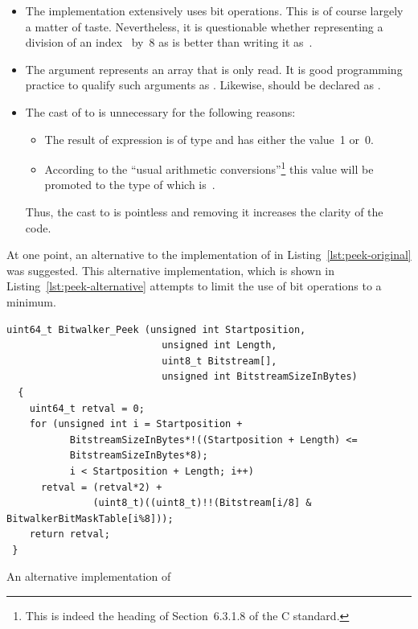 \begin{itemize}
\item The implementation extensively uses bit operations.
      This is of course largely a matter of taste.
      Nevertheless, it is questionable whether representing a division 
      of an index~ by~8 as  is better than writing it as~.
\item The argument  represents an array that is only read.
      It is good programming practice to qualify such arguments as .
	Likewise,  should be declared as .

\item The cast of  to  is unnecessary for the following reasons:
\begin{itemize}
\item The result of expression  is of type  and has either the value~1 or~0.
\item According to the ``usual arithmetic conversions''\footnote{%
     This is indeed the heading of Section~6.3.1.8 of the C standard.
}
this value will be promoted to the type of  which is~.
\end{itemize}

    Thus, the cast to  is pointless and removing it increases the clarity of the code.

\end{itemize}

At one point, an alternative to the implementation of \peek in
Listing~\ref{lst:peek-original} was suggested.
This alternative implementation, which is shown in Listing~\ref{lst:peek-alternative}
attempts to limit the use of bit operations to a minimum.


\begin{listing}[hbt]
\begin{minipage}{\textwidth}
\begin{lstlisting}[style=acsl-block,frame=single]
  uint64_t Bitwalker_Peek (unsigned int Startposition,
                           unsigned int Length,
                           uint8_t Bitstream[],
                           unsigned int BitstreamSizeInBytes)
  {
    uint64_t retval = 0;
    for (unsigned int i = Startposition +
           BitstreamSizeInBytes*!((Startposition + Length) <=
           BitstreamSizeInBytes*8);
           i < Startposition + Length; i++)
      retval = (retval*2) +
               (uint8_t)((uint8_t)!!(Bitstream[i/8] & BitwalkerBitMaskTable[i%8]));
    return retval;
 }
\end{lstlisting}
\end{minipage}
\caption{\label{lst:peek-alternative} An alternative implementation of \peek}
\end{listing}

